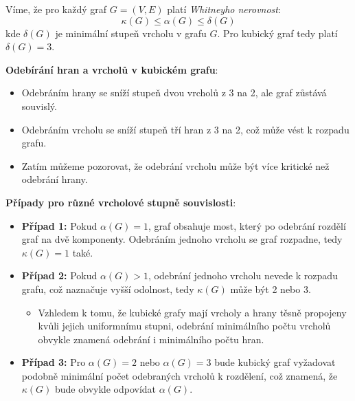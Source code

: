 \documentclass[10pt, a4paper]{ReportSheet}
\begin{document}

    Víme, že pro každý graf $G=(V, E)$ platí \textit{Whitneyho nerovnost}:
    \begin{equation*}
        \kappa(G) \leq \alpha(G) \leq \delta(G)
    \end{equation*}
    kde $\delta(G)$ je minimální stupeň vrcholu v grafu $G$. Pro kubický graf tedy platí $\delta(G) = 3$.

    \textbf{Odebírání hran a vrcholů v kubickém grafu}:
    \begin{itemize}
        \item Odebráním hrany se sníží stupeň dvou vrcholů z 3 na 2, ale graf zůstává souvislý.
        \item Odebráním vrcholu se sníží stupeň tří hran z 3 na 2, což může vést k rozpadu grafu.
        \item Zatím můžeme pozorovat, že odebrání vrcholu může být více kritické než odebrání hrany.
    \end{itemize}

    \textbf{Případy pro různé vrcholové stupně souvislosti}:
    \begin{itemize}
        \item \textbf{Případ 1:} Pokud $\alpha(G) = 1$, graf obsahuje most, který po odebrání rozdělí graf na dvě
        komponenty. Odebráním jednoho vrcholu se graf rozpadne, tedy $\kappa(G) = 1$ také.
        \item \textbf{Případ 2:} Pokud $\alpha(G) > 1$, odebrání jednoho vrcholu nevede k rozpadu grafu, což naznačuje vyšší odolnost, tedy $\kappa(G)$ může být 2 nebo 3.
        \begin{itemize}
            \item Vzhledem k tomu, že kubické grafy mají vrcholy a hrany těsně propojeny kvůli jejich uniformnímu stupni, odebrání minimálního počtu vrcholů obvykle znamená odebrání i minimálního počtu hran.
        \end{itemize}
        \item \textbf{Případ 3:} Pro $\alpha(G) = 2$ nebo $\alpha(G) = 3$ bude kubický graf vyžadovat podobně minimální počet odebraných vrcholů k rozdělení, což znamená, že $\kappa(G)$ bude obvykle odpovídat $\alpha(G)$.
    \end{itemize}
\end{document}
